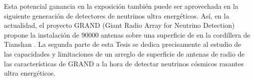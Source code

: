 Esta potencial ganancia en la exposici\'on tambi\'en puede ser aprovechada en la siguiente generaci\'on de detectores de neutrinos ultra energ\'eticos. As\'i, en la actualidad, el proyecto GRAND (Giant Radio Array for Neutrino Detection)~\cite{cite:grand_prop} propone la instalaci\'on de 90000 antenas sobre una superficie de  en la cordillera de Tianshan \cite{cite:grand_tec}.
La segunda parte de esta Tesis se dedica precisamente al estudio de las capacidades y limitaciones de un arreglo de superficie de antenas de radio de las caracter\'isticas de GRAND a la hora de detectar neutrinos cósmicos rasantes ultra energéticos.

